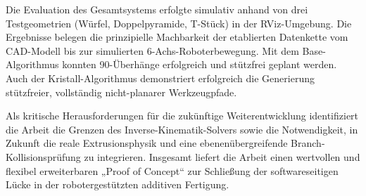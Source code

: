 Die Evaluation des Gesamtsystems erfolgte simulativ anhand von drei Testgeometrien (Würfel, Doppelpyramide, T-Stück) in der RViz-Umgebung.
Die Ergebnisse belegen die prinzipielle Machbarkeit der etablierten Datenkette vom \acs{CAD}-Modell bis zur simulierten 6-Achs-Roboterbewegung.
Mit dem Base-Algorithmus konnten 90\degree-Überhänge erfolgreich und stützfrei geplant werden.
Auch der Kristall-Algorithmus demonstriert erfolgreich die Generierung stützfreier, vollständig nicht-planarer Werkzeugpfade.

Als kritische Herausforderungen für die zukünftige Weiterentwicklung identifiziert die Arbeit die Grenzen des Inverse-Kinematik-Solvers sowie die Notwendigkeit,
in Zukunft die reale Extrusionsphysik und eine ebenenübergreifende Branch-Kollisionsprüfung zu integrieren.
Insgesamt liefert die Arbeit einen wertvollen und flexibel erweiterbaren „Proof of Concept“ zur Schließung der softwareseitigen Lücke in der robotergestützten additiven Fertigung.
